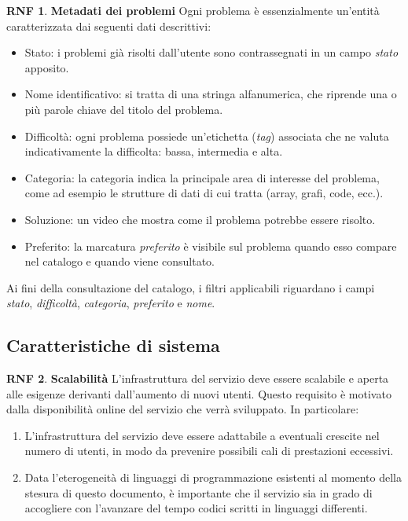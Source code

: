 \documentclass[11pt, a4paper]{article}
\theoremstyle{definition}
\newtheorem{nonfuncreq}{RNF} %
\begin{document}
\begin{nonfuncreq}
\label{metadata}
\textbf{Metadati dei problemi } Ogni problema è essenzialmente un'entità
caratterizzata dai seguenti dati descrittivi:
\begin{itemize}
    \item Stato: i problemi già risolti dall'utente sono contrassegnati
    in un campo \textit{stato} apposito.

    \item Nome identificativo: si tratta di una stringa alfanumerica, che
    riprende una o più parole chiave del titolo del problema.
    
    \item Difficoltà: ogni problema possiede un'etichetta (\textit{tag})
    associata che ne valuta indicativamente la difficolta: bassa,
    intermedia e alta.

    \item Categoria: la categoria indica la principale area di interesse
    del problema, come ad esempio le strutture di dati di cui tratta
    (array, grafi, code, ecc.).

    \item Soluzione: un video che mostra come il problema potrebbe essere
    risolto.

    \item Preferito: la marcatura \textit{preferito} è visibile sul problema
    quando esso compare nel catalogo e quando viene consultato.
\end{itemize}
Ai fini della consultazione del catalogo, i filtri applicabili riguardano
i campi \textit{stato}, \textit{difficoltà}, \textit{categoria}, \textit{preferito}
e \textit{nome}.
\end{nonfuncreq}

\subsection{Caratteristiche di sistema}

\begin{nonfuncreq}
\label{scalabilita}
\textbf{Scalabilità }
L'infrastruttura del servizio deve essere scalabile e aperta alle esigenze
derivanti dall'aumento di nuovi utenti. Questo requisito è motivato dalla
disponibilità online del servizio che verrà sviluppato. In particolare:
\begin{enumerate}
    \item L'infrastruttura del servizio deve essere adattabile a eventuali
    crescite nel numero di utenti, in modo da prevenire possibili cali di
    prestazioni eccessivi.

    \item Data l'eterogeneità di linguaggi di programmazione esistenti
    al momento della stesura di questo documento, è importante che il
    servizio sia in grado di accogliere con l'avanzare del tempo codici
    scritti in linguaggi differenti.
\end{enumerate}
\end{nonfuncreq}
\end{document}
